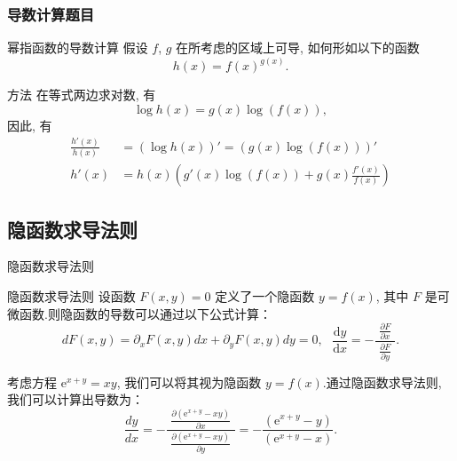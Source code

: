 \documentclass[
10pt,
aspectratio=43,
]{beamer}
\begin{document}
\begin{frame}
	\frametitle{导数计算题目}
	\begin{block}{幂指函数的导数计算}
		假设 $f$, $g$ 在所考虑的区域上可导, 如何形如以下的函数
		\[
			h(x)=f(x)^{g(x)}.
		\]
	\end{block}

	\pause

	\begin{exampleblock}{方法}
		在等式两边求对数, 有
		\[
			\log h(x) = g(x)\log (f(x)),
		\]
		因此, 有
		\begin{align*}
			\displaystyle\frac{h'(x)}{h(x)} & =(\log h(x))' = (g(x)\log (f(x)))'                                     \\
			h'(x)                           & =\displaystyle h(x)\left(g'(x)\log(f(x))+g(x)\frac{f'(x)}{f(x)}\right)
		\end{align*}
	\end{exampleblock}
\end{frame}

\subsection{隐函数求导法则}
\begin{frame}{隐函数求导法则}
	\begin{block}{隐函数求导法则}
		设函数 $F(x, y) = 0$ 定义了一个隐函数 $y = f(x)$, 其中 $F$ 是可微函数.则隐函数的导数可以通过以下公式计算：
		\[
			d F(x, y)=\partial_xF(x,y) d x+\partial_yF(x,y) d y=0,\,\,\,\, \frac{\mathrm{d}y}{\mathrm{d}x} = -\frac{\displaystyle\,\,{\frac{{\partial F}}{{\partial x}}}\,\,}{{\displaystyle\frac{{\partial F}}{{\partial y}}}}.
		\]
	\end{block}

	\pause

	\begin{example}
		考虑方程 $\mathrm{e}^{x+y}=xy$, 我们可以将其视为隐函数 $y = f(x)$.通过隐函数求导法则, 我们可以计算出导数为：
		\[
			\displaystyle\frac{{dy}}{{dx}} = -\displaystyle\frac{\,\,{\displaystyle\frac{{\partial (\mathrm{e}^{x+y}-xy)}}{{\partial x}}}\,\,}{{\displaystyle\frac{{\partial (\mathrm{e}^{x+y}-xy)}}{{\partial y}}}} = -\frac{{(\mathrm{e}^{x+y}-y)}}{{(\mathrm{e}^{x+y}-x)}}.
		\]
	\end{example}
\end{frame}
\end{document}
